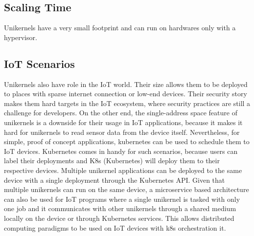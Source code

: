 \subsection{Scaling Time}
Unikernels have a very small footprint and can run on hardwares only with a hypervisor.

\subsection{IoT Scenarios}
Unikernels also have role in the IoT world. Their size allows them to be deployed to places with sparse internet connection or low-end devices. Their security story makes them hard targets in the IoT ecosystem, where security practices are still a challenge for developers. \cite{iot-sec} On the other end, the single-address space feature of unikernels is a downside for their usage in IoT applications, because it makes it hard for unikernels to read sensor data from the device itself. Nevertheless, for simple, proof of concept applications, kubernetes can be used to schedule them to IoT devices. Kubernetes comes in handy for such scenarios, because users can label their deployments and K8s (Kubernetes) will deploy them to their respective devices. Multiple unikernel applications can be deployed to the same device with a single deployment through the Kubernetes API. Given that multiple unikernels can run on the same device, a microservice based architecture can also be used for IoT programs where a single unikernel is tasked with only one job and it communicates with other unikernels through a shared medium locally on the device or through Kubernetes services. This allows distributed computing paradigms to be used on IoT devices with k8s orchestration it.

